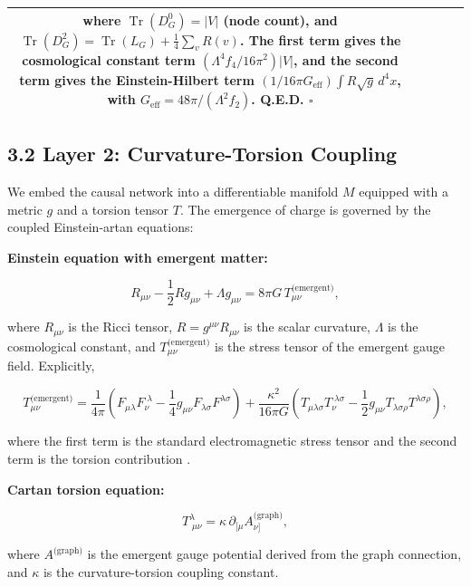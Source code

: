\documentclass[11pt,a4paper]{article}
\theoremstyle{plain}
\theoremstyle{definition}
\begin{document}
\begin{table}[h]
\centering
\begin{tabular}{|c|c|c|c|c|}
\hline
where $\operatorname{Tr}(D_G^0) = |V|$ (node count), and $\operatorname{Tr}(D_G^2) = \operatorname{Tr}(L_G) + \frac{1}{4} \sum_v R(v)$. The first term gives the cosmological constant term $(\Lambda^4 f_4 / 16\pi^2) |V|$, and the second term gives the Einstein-Hilbert term $(1/16\pi G_{\text{eff}}) \int R\sqrt{g} \, d^4x$, with $G_{\text{eff}} = 48\pi / (\Lambda^2 f_2)$. \textbf{Q.E.D.} $\square$ \\ \hline
\end{tabular}
\end{table}

\subsection{3.2 Layer 2: Curvature-Torsion Coupling}

We embed the causal network into a differentiable manifold $M$ equipped with a metric $g$ and a torsion tensor $T$. The emergence of charge is governed by the coupled Einstein-artan equations:

\textbf{Einstein equation with emergent matter:}

$$R_{\mu\nu} - \frac{1}{2} R g_{\mu\nu} + \Lambda g_{\mu\nu} = 8\pi G \, T^{\text{(emergent)}}_{\mu\nu},$$

where $R_{\mu\nu}$ is the Ricci tensor, $R = g^{\mu\nu} R_{\mu\nu}$ is the scalar curvature, $\Lambda$ is the cosmological constant, and $T^{\text{(emergent)}}_{\mu\nu}$ is the stress tensor of the emergent gauge field. Explicitly,

$$T^{\text{(emergent)}}_{\mu\nu} = \frac{1}{4\pi} \left( F_{\mu\lambda} F_{\nu}^{\;\lambda} - \frac{1}{4} g_{\mu\nu} F_{\lambda\sigma} F^{\lambda\sigma} \right) + \frac{\kappa^2}{16\pi G} \left( T_{\mu\lambda\sigma} T_{\nu}^{\;\lambda\sigma} - \frac{1}{2} g_{\mu\nu} T_{\lambda\sigma\rho} T^{\lambda\sigma\rho} \right),$$

where the first term is the standard electromagnetic stress tensor and the second term is the torsion contribution \cite{Hehl1976}.

\textbf{Cartan torsion equation:}

$$T^{\lambda}_{\;\mu\nu} = \kappa \, \partial_{[\mu} A_{\nu]}^{\text{(graph)}},$$

where $A^{\text{(graph)}}$ is the emergent gauge potential derived from the graph connection, and $\kappa$ is the curvature-torsion coupling constant.
\end{document}

